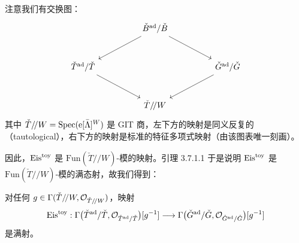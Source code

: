 注意我们有交换图：
\[
\begin{tikzcd}[column sep=huge, row sep=large]
  & \check B^{\mathrm{ad}}/\check B \arrow[dl] \arrow[dr] & \\
  \check T^{\mathrm{ad}}/\check T \arrow[dr] & & \check G^{\mathrm{ad}}/\check G \arrow[dl] \\
  & \check T/\!/W &
\end{tikzcd}
\]
其中 $\check T/\!/W=\operatorname{Spec}(\mathrm{e}[\bar\Lambda]^W)$ 是 GIT 商，左下方的映射是同义反复的（tautological），右下方的映射是标准的特征多项式映射（由该图表唯一刻画）。

因此，$\mathrm{Eis}^{\mathrm{toy}}$ 是 $\mathrm{Fun}(\check T/\!/W)$-模的映射。引理 3.7.1.1 于是说明 $\mathrm{Eis}^{\mathrm{toy}}$ 是 $\mathrm{Fun}(\check T/\!/W)$-模的满态射，故我们得到：

\begin{cor}
对任何 $g\in\Gamma(\check T/\!/W,\mathcal{O}_{\check T/\!/W})$，映射
\[
  \mathrm{Eis}^{\mathrm{toy}} : \Gamma\bigl(\check T^{\mathrm{ad}}/\check T,\mathcal{O}_{\check T^{\mathrm{ad}}/\check T}\bigr)[g^{-1}]
  \longrightarrow
  \Gamma\bigl(\check G^{\mathrm{ad}}/\check G,\mathcal{O}_{\check G^{\mathrm{ad}}/\check G}\bigr)[g^{-1}]
\]
是满射。
\end{cor}
